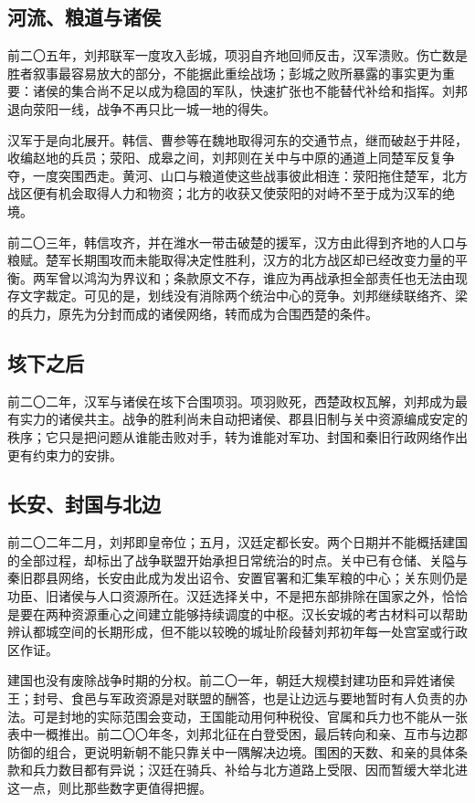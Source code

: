 \subsection{河流、粮道与诸侯}

前二〇五年，刘邦联军一度攻入彭城，项羽自齐地回师反击，汉军溃败。伤亡数是胜者叙事最容易放大的部分，不能据此重绘战场；彭城之败所暴露的事实更为重要：诸侯的集合尚不足以成为稳固的军队，快速扩张也不能替代补给和指挥。刘邦退向荥阳一线，战争不再只比一城一地的得失。

汉军于是向北展开。韩信、曹参等在魏地取得河东的交通节点，继而破赵于井陉，收编赵地的兵员；荥阳、成皋之间，刘邦则在关中与中原的通道上同楚军反复争夺，一度突围西走。黄河、山口与粮道使这些战事彼此相连：荥阳拖住楚军，北方战区便有机会取得人力和物资；北方的收获又使荥阳的对峙不至于成为汉军的绝境。

前二〇三年，韩信攻齐，并在潍水一带击破楚的援军，汉方由此得到齐地的人口与粮赋。楚军长期围攻而未能取得决定性胜利，汉方的北方战区却已经改变力量的平衡。两军曾以鸿沟为界议和；条款原文不存，谁应为再战承担全部责任也无法由现存文字裁定。可见的是，划线没有消除两个统治中心的竞争。刘邦继续联络齐、梁的兵力，原先为分封而成的诸侯网络，转而成为合围西楚的条件。

\subsection{垓下之后}

前二〇二年，汉军与诸侯在垓下合围项羽。项羽败死，西楚政权瓦解，刘邦成为最有实力的诸侯共主。战争的胜利尚未自动把诸侯、郡县旧制与关中资源编成安定的秩序；它只是把问题从谁能击败对手，转为谁能对军功、封国和秦旧行政网络作出更有约束力的安排。

\subsection{长安、封国与北边}

前二〇二年二月，刘邦即皇帝位；五月，汉廷定都长安。两个日期并不能概括建国的全部过程，却标出了战争联盟开始承担日常统治的时点。关中已有仓储、关隘与秦旧郡县网络，长安由此成为发出诏令、安置官署和汇集军粮的中心；关东则仍是功臣、旧诸侯与人口资源所在。汉廷选择关中，不是把东部排除在国家之外，恰恰是要在两种资源重心之间建立能够持续调度的中枢。汉长安城的考古材料可以帮助辨认都城空间的长期形成，但不能以较晚的城址阶段替刘邦初年每一处宫室或行政区作证。

建国也没有废除战争时期的分权。前二〇一年，朝廷大规模封建功臣和异姓诸侯王；封号、食邑与军政资源是对联盟的酬答，也是让边远与要地暂时有人负责的办法。可是封地的实际范围会变动，王国能动用何种税役、官属和兵力也不能从一张表中一概推出。前二〇〇年冬，刘邦北征在白登受困，最后转向和亲、互市与边郡防御的组合，更说明新朝不能只靠关中一隅解决边境。围困的天数、和亲的具体条款和兵力数目都有异说；汉廷在骑兵、补给与北方道路上受限、因而暂缓大举北进这一点，则比那些数字更值得把握。

